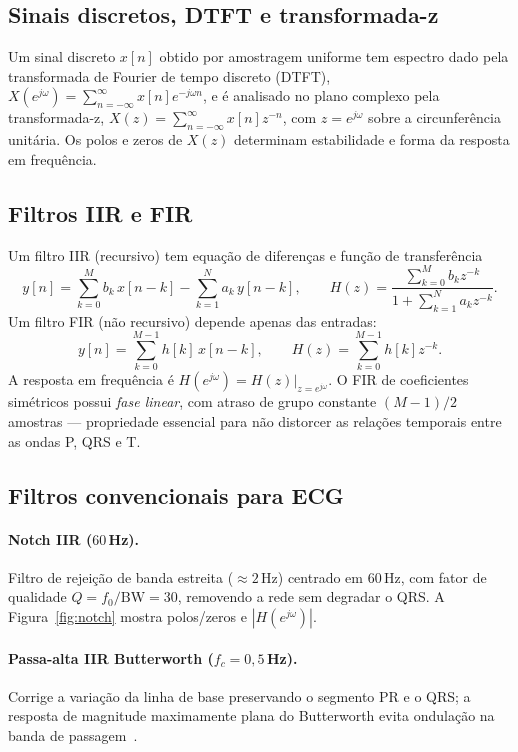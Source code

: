 \documentclass[11pt,a4paper]{article}
\begin{document}
\subsection{Sinais discretos, DTFT e transformada-z}
Um sinal discreto $x[n]$ obtido por amostragem uniforme tem espectro dado pela
transformada de Fourier de tempo discreto (DTFT),
$X(e^{j\omega})=\sum_{n=-\infty}^{\infty}x[n]e^{-j\omega n}$, e \'e analisado no plano
complexo pela transformada-z, $X(z)=\sum_{n=-\infty}^{\infty}x[n]z^{-n}$, com
$z=e^{j\omega}$ sobre a circunfer\^encia unit\'aria. Os polos e zeros de $X(z)$ determinam
estabilidade e forma da resposta em frequ\^encia.

\subsection{Filtros IIR e FIR}
Um filtro IIR (recursivo) tem equa\c{c}\~ao de diferen\c{c}as e fun\c{c}\~ao de
transfer\^encia
\begin{equation}
y[n]=\sum_{k=0}^{M} b_k\,x[n-k]-\sum_{k=1}^{N} a_k\,y[n-k],
\qquad
H(z)=\frac{\sum_{k=0}^{M} b_k z^{-k}}{1+\sum_{k=1}^{N} a_k z^{-k}}.
\end{equation}
Um filtro FIR (n\~ao recursivo) depende apenas das entradas:
\begin{equation}
y[n]=\sum_{k=0}^{M-1} h[k]\,x[n-k],
\qquad
H(z)=\sum_{k=0}^{M-1} h[k] z^{-k}.
\end{equation}
A resposta em frequ\^encia \'e $H(e^{j\omega})=H(z)\big|_{z=e^{j\omega}}$. O FIR de
coeficientes sim\'etricos possui \emph{fase linear}, com atraso de grupo constante
$(M-1)/2$ amostras --- propriedade essencial para n\~ao distorcer as rela\c{c}\~oes
temporais entre as ondas P, QRS e T.

\subsection{Filtros convencionais para ECG}
\paragraph{Notch IIR ($60\,$Hz).} Filtro de rejei\c{c}\~ao de banda estreita
($\approx 2\,$Hz) centrado em $60\,$Hz, com fator de qualidade $Q=f_0/\mathrm{BW}=30$,
removendo a rede sem degradar o QRS. A Figura~\ref{fig:notch} mostra polos/zeros e
$|H(e^{j\omega})|$.
\paragraph{Passa-alta IIR Butterworth ($f_c=0{,}5\,$Hz).} Corrige a varia\c{c}\~ao da
linha de base preservando o segmento PR e o QRS; a resposta de magnitude maximamente plana
do Butterworth evita ondula\c{c}\~ao na banda de passagem~\cite{challis1983part3}.
\end{document}

